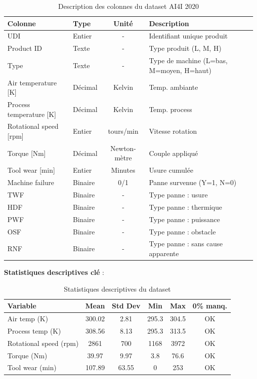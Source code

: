 \documentclass[a4paper,12pt,twoside]{report}
\begin{document}
\begin{table}[H]
\centering
\small
\caption{Description des colonnes du dataset AI4I 2020}
\begin{tabular}{|l|l|c|l|}
\hline
\textbf{Colonne} & \textbf{Type} & \textbf{Unité} & \textbf{Description} \\
\hline\hline
UDI & Entier & - & Identifiant unique produit \\
\hline
Product ID & Texte & - & Type produit (L, M, H) \\
\hline
Type & Texte & - & Type de machine (L=bas, M=moyen, H=haut) \\
\hline
Air temperature [K] & Décimal & Kelvin & Temp. ambiante \\
\hline
Process temperature [K] & Décimal & Kelvin & Temp. process \\
\hline
Rotational speed [rpm] & Entier & tours/min & Vitesse rotation \\
\hline
Torque [Nm] & Décimal & Newton-mètre & Couple appliqué \\
\hline
Tool wear [min] & Entier & Minutes & Usure cumulée \\
\hline
Machine failure & Binaire & 0/1 & Panne survenue (Y=1, N=0) \\
\hline
TWF & Binaire & - & Type panne : usure \\
\hline
HDF & Binaire & - & Type panne : thermique \\
\hline
PWF & Binaire & - & Type panne : puissance \\
\hline
OSF & Binaire & - & Type panne : obstacle \\
\hline
RNF & Binaire & - & Type panne : sans cause apparente \\
\hline
\end{tabular}
\end{table}

\textbf{Statistiques descriptives clé} :

\begin{table}[H]
\centering
\small
\caption{Statistiques descriptives du dataset}
\begin{tabular}{|l|c|c|c|c|c|}
\hline
\textbf{Variable} & \textbf{Mean} & \textbf{Std Dev} & \textbf{Min} & \textbf{Max} & \textbf{0\% manq.} \\
\hline\hline
Air temp (K) & 300.02 & 2.81 & 295.3 & 304.5 & OK \\
\hline
Process temp (K) & 308.56 & 8.13 & 295.3 & 313.5 & OK \\
\hline
Rotational speed (rpm) & 2861 & 700 & 1168 & 3972 & OK \\
\hline
Torque (Nm) & 39.97 & 9.97 & 3.8 & 76.6 & OK \\
\hline
Tool wear (min) & 107.89 & 63.55 & 0 & 253 & OK \\
\hline
\end{tabular}
\end{table}
\end{document}
